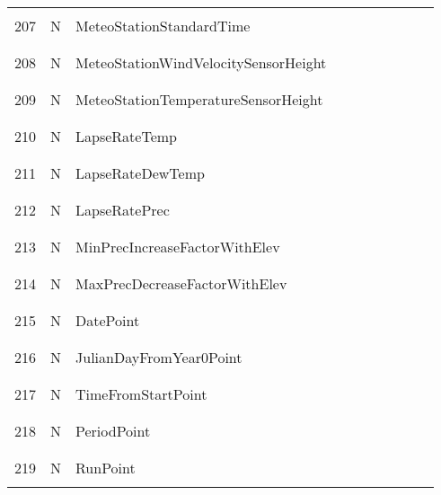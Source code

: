 \begin{longtable}{|c|c|l|c|c|c|c|p{}|c|p{}|}
&&&&&&&&&\\\hline%
&&&&&&&&&\\
207 & N & MeteoStationStandardTime & & & & & & & \\
&&&&&&&&&\\\hline%
&&&&&&&&&\\
208 & N & MeteoStationWindVelocitySensorHeight & & & & & & & \\
&&&&&&&&&\\\hline%
&&&&&&&&&\\
209 & N & MeteoStationTemperatureSensorHeight & & & & & & & \\
&&&&&&&&&\\\hline%
&&&&&&&&&\\
210 & N & LapseRateTemp & & & & & & & \\
&&&&&&&&&\\\hline%
&&&&&&&&&\\
211 & N & LapseRateDewTemp & & & & & & & \\
&&&&&&&&&\\\hline%
&&&&&&&&&\\
212 & N & LapseRatePrec & & & & & & & \\
&&&&&&&&&\\\hline%
&&&&&&&&&\\
213 & N & MinPrecIncreaseFactorWithElev & & & & & & & \\
&&&&&&&&&\\\hline%
&&&&&&&&&\\
214 & N & MaxPrecDecreaseFactorWithElev & & & & & & & \\
&&&&&&&&&\\\hline%
&&&&&&&&&\\
215 & N & DatePoint & & & & & & & \\
&&&&&&&&&\\\hline%
&&&&&&&&&\\
216 & N & JulianDayFromYear0Point & & & & & & & \\
&&&&&&&&&\\\hline%
&&&&&&&&&\\
217 & N & TimeFromStartPoint & & & & & & & \\
&&&&&&&&&\\\hline%
&&&&&&&&&\\
218 & N & PeriodPoint & & & & & & & \\
&&&&&&&&&\\\hline%
&&&&&&&&&\\
219 & N & RunPoint & & & & & & & \\
&&&&&&&&&\\\hline%

\end{longtable}
